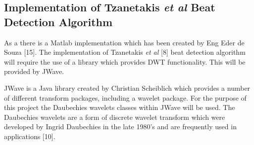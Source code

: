 \documentclass[a4paper, 11pt]{article}
\begin{document}

\subsection{Implementation of Tzanetakis \textit{et al} Beat Detection Algorithm}


 As a there is a Matlab implementation which has been created by Eng Eder de Souza [15].
The implementation of Tzanetakis \textit{et al} [8] beat detection algorithm will require the use of a library which provides DWT functionality. This will be provided by JWave. 

JWave is a Java library created by Christian Scheiblich which provides a number of different transform packages, including a wavelet package. For the purpose of this project the Daubechies wavelets classes within JWave will be used. The Daubechies wavelets are a form of discrete wavelet transform which were developed by Ingrid Daubechies in the late 1980's and are frequently used in applications [10]. 
\end{document}
